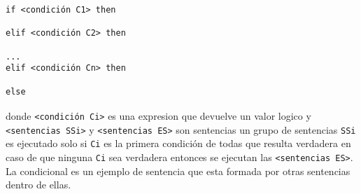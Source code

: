       \texttt{if~<condición C1>~then   }\\
      \texttt{     }\\
      \texttt{elif~<condición C2>~then }\\
      \texttt{     }\\
      \texttt{...                      }\\
      \texttt{elif~<condición Cn>~then }\\
      \texttt{     }\\
      \texttt{else                     }\\
      \texttt{      }
      \\
      
      donde \texttt{<condición Ci>} es una expresion que devuelve un valor logico y \texttt{<sentencias SSi>} y \texttt{<sentencias ES>} son sentencias un grupo de sentencias \texttt{SSi} es ejecutado solo si \texttt{Ci} es la primera condición de todas que resulta verdadera en caso de que ninguna \texttt{Ci} sea verdadera entonces se ejecutan las \texttt{<sentencias ES>}.
      \\
      
      La condicional es un ejemplo de sentencia que esta formada por otras sentencias dentro de ellas.
      
      \begin{fxcode}
         \\
         \\
         \\
         \\
         \\
         \\
         \\
         \\
         \\
         \\
      \end{fxcode}
      
